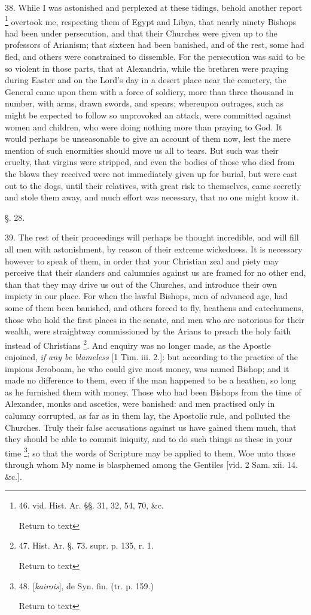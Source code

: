 38. While I was astonished and perplexed at these tidings, behold
another report \footnote{46. vid. Hist. Ar. §§. 31, 32, 54, 70, \&c.

Return to text}
overtook me, respecting them of Egypt and Libya, that nearly ninety
Bishops had been under persecution, and that their Churches were given
up to the professors of Arianism; that sixteen had been banished, and
of the rest, some had fled, and others were constrained to dissemble.
For the persecution was said to be so violent in those parts, that at
Alexandria, while the brethren were praying during Easter and on the
Lord's day in a desert place near the cemetery, the General came upon
them with a force of soldiery, more than three thousand in number,
with arms, drawn swords, and spears; whereupon outrages, such as might
be expected to follow so unprovoked an attack, were committed against
women and children, who were doing nothing more than praying to God.
It would perhaps be unseasonable to give an account of them now, lest
the mere mention of such enormities should move us all to tears. But
such was their cruelty, that virgins were stripped, and even the
bodies of those who died from the blows they received were not
immediately given up for burial, but were cast out to the dogs, until
their relatives, with great risk to themselves, came secretly and
stole them away, and much effort was necessary, that no one might know
it.

§. 28.

39. The rest of their proceedings will perhaps be thought incredible,
and will fill all men with astonishment, by reason of their extreme
wickedness. It is necessary however to speak of them, in order that
your Christian zeal and piety may perceive that their slanders and
calumnies against us are framed for no other end, than that they may
drive us out of the Churches, and introduce their own impiety in our
place. For when the lawful Bishops, men of advanced age, had some of
them been banished, and others forced to fly, heathens and
catechumens, those who hold the first places in the senate, and
men who are notorious for their wealth, were straightway commissioned
by the Arians to preach the holy faith instead of Christians \footnote{47. Hist. Ar. §. 73. supr. p. 135, r. 1.

Return to text}. And enquiry was no longer made, as the Apostle enjoined, \emph{if any be blameless}
[1 Tim. iii. 2.]: but according to the practice of the impious
Jeroboam, he who could give most money, was named Bishop; and it made
no difference to them, even if the man happened to be a heathen, so
long as he furnished them with money. Those who had been Bishops from
the time of Alexander, monks and ascetics, were banished: and men
practised only in calumny corrupted, as far as in them lay, the
Apostolic rule, and polluted the Churches. Truly their false
accusations against us have gained them much, that they should be able
to commit iniquity, and to do such things as these in your time \footnote{48. [\emph{kairois}], de Syn. fin. (tr. p. 159.)

Return to text}; so that the words of Scripture may be applied to them, Woe
unto those through whom My name is blasphemed among the Gentiles [vid.
2 Sam. xii. 14. \&c.].

